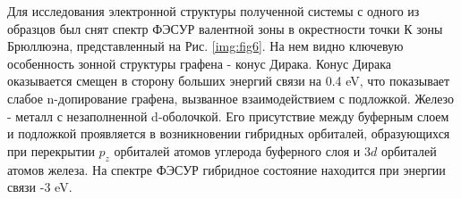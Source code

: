 Для исследования электронной структуры полученной системы с одного из образцов был снят спектр ФЭСУР валентной зоны в окрестности точки К зоны Брюллюэна, представленный на Рис. \ref{img:fig6}. На нем видно ключевую особенность зонной структуры графена - конус Дирака. Конус Дирака оказывается смещен в сторону больших энергий связи на 0.4 eV, что показывает слабое n-допирование графена, вызванное взаимодействием с подложкой. Железо - металл с незаполненной d-оболочкой. Его присутствие между буферным слоем и подложкой проявляется в возникновении гибридных орбиталей, образующихся при перекрытии $p_z$ орбиталей атомов углерода буферного слоя и $3d$ орбиталей атомов железа. На спектре ФЭСУР гибридное состояние находится при энергии связи -3 eV.


